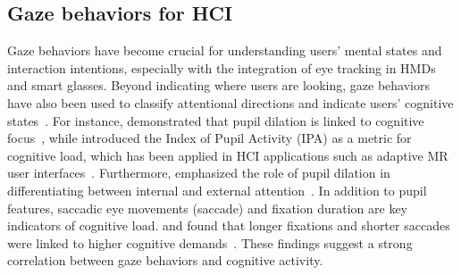

\subsection{Gaze behaviors for HCI}

Gaze behaviors have become crucial for understanding users' mental states and interaction intentions, especially with the integration of eye tracking in HMDs and smart glasses.
Beyond indicating where users are looking, gaze behaviors have also been used to classify attentional directions and indicate users' cognitive states~\cite{wang2019exploring}.
For instance, \citeauthor{benedek2017eye} demonstrated that pupil dilation is linked to cognitive focus~\cite{benedek2017eye}, while \citeauthor{duchowski2018index} introduced the Index of Pupil Activity (IPA) as a metric for cognitive load, which has been applied in HCI applications such as adaptive MR user interfaces~\cite{lindlbauer2019context}.
Furthermore, \citeauthor{annerer2021reliably} emphasized the role of pupil dilation in differentiating between internal and external attention~\cite{annerer2021reliably}.
In addition to pupil features, saccadic eye movements (saccade) and fixation duration are key indicators of cognitive load.
\citeauthor{zagermann2016measuring} and \citeauthor{holmqvist2011eye} found that longer fixations and shorter saccades were linked to higher cognitive demands~\cite{zagermann2016measuring, holmqvist2011eye}. 
These findings suggest a strong correlation between gaze behaviors and cognitive activity. 


